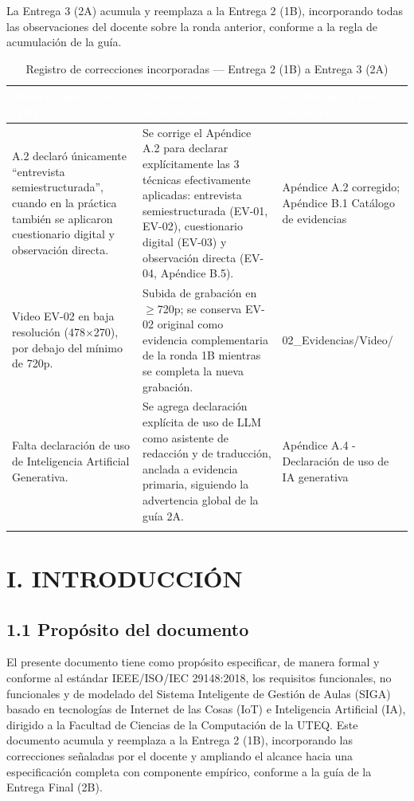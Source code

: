 La Entrega 3 (2A) acumula y reemplaza a la Entrega 2 (1B), incorporando todas las observaciones del docente sobre la ronda anterior, conforme a la regla de acumulación de la guía.


\begingroup
\small
\begin{longtable}{|P{0.3333}|P{0.3333}|P{0.3333}|}
\hline
{}\textcolor{white}{\textbf{Observación docente (1B)}} & \textcolor{white}{\textbf{Corrección incorporada}} & \textcolor{white}{\textbf{Evidencia en este documento}} \\ \hline
A.2 declaró únicamente ``entrevista semiestructurada'', cuando en la práctica también se aplicaron cuestionario digital y observación directa. & Se corrige el Apéndice A.2 para declarar explícitamente las 3 técnicas efectivamente aplicadas: entrevista semiestructurada (EV-01, EV-02), cuestionario digital (EV-03) y observación directa (EV-04, Apéndice B.5). & Apéndice A.2 corregido; Apéndice B.1 Catálogo de evidencias \\ \hline
Video EV-02 en baja resolución (478$\times$270), por debajo del mínimo de 720p. & Subida de grabación en $\geq$720p; se conserva EV-02 original como evidencia complementaria de la ronda 1B mientras se completa la nueva grabación. & 02\_Evidencias/Video/ \\ \hline
Falta declaración de uso de Inteligencia Artificial Generativa. & Se agrega declaración explícita de uso de LLM como asistente de redacción y de traducción, anclada a evidencia primaria, siguiendo la advertencia global de la guía 2A. & Apéndice A.4 - Declaración de uso de IA generativa \\ \hline
\caption{Registro de correcciones incorporadas --- Entrega 2 (1B) a Entrega 3 (2A)}
\end{longtable}
\endgroup

\section*{I. INTRODUCCIÓN}


\subsection*{1.1 Propósito del documento}


El presente documento tiene como propósito especificar, de manera formal y conforme al estándar IEEE/ISO/IEC 29148:2018, los requisitos funcionales, no funcionales y de modelado del Sistema Inteligente de Gestión de Aulas (SIGA) basado en tecnologías de Internet de las Cosas (IoT) e Inteligencia Artificial (IA), dirigido a la Facultad de Ciencias de la Computación de la UTEQ. Este documento acumula y reemplaza a la Entrega 2 (1B), incorporando las correcciones señaladas por el docente y ampliando el alcance hacia una especificación completa con componente empírico, conforme a la guía de la Entrega Final (2B).


